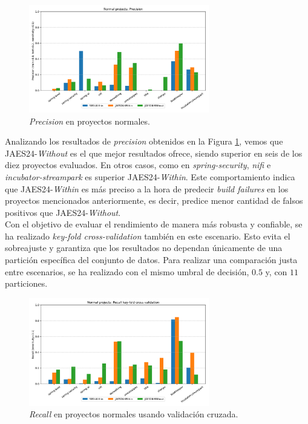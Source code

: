 \begin{figure}
    \centering
    \includegraphics[width=0.7\textwidth]{images/Normal projects: Precision.pdf}
    \caption{\textit{Precision} en proyectos normales.}
    \label{fig:train_test_precision_normal_projects}
\end{figure}

Analizando los resultados de \textit{precision} obtenidos en la Figura
\ref{fig:train_test_precision_normal_projects}, vemos que JAES24-\textit{Without} es el que mejor
resultados ofrece, siendo superior en seis de los diez proyectos evaluados. En otros casos, como
en \textit{spring-security}, \textit{nifi} e \textit{incubator-streampark} es superior 
JAES24-\textit{Within}. Este comportamiento indica que JAES24-\textit{Within} es más preciso
a la hora de predecir \textit{build failures} en los proyectos mencionados anteriormente, es decir, 
predice menor cantidad de falsos positivos que JAES24-\textit{Without}.\\

Con el objetivo de evaluar el rendimiento de manera más robusta y confiable, se ha realizado
\textit{key-fold cross-validation} también en este escenario. Esto evita el sobreajuste y
garantiza que los resultados no dependan únicamente de una partición específica del conjunto
de datos. Para realizar una comparación justa entre escenarios, se ha realizado con el mismo
umbral de decisión, $0.5$ y, con $11$ particiones.

\begin{figure}[H]
    \centering
    \includegraphics[width=0.7\textwidth]{images/Normal projects: Recall key-fold cross validation.pdf}
    \caption{\textit{Recall} en proyectos normales usando validación cruzada.}
    \label{fig:key-fold_recall_normal_projects}
\end{figure}

